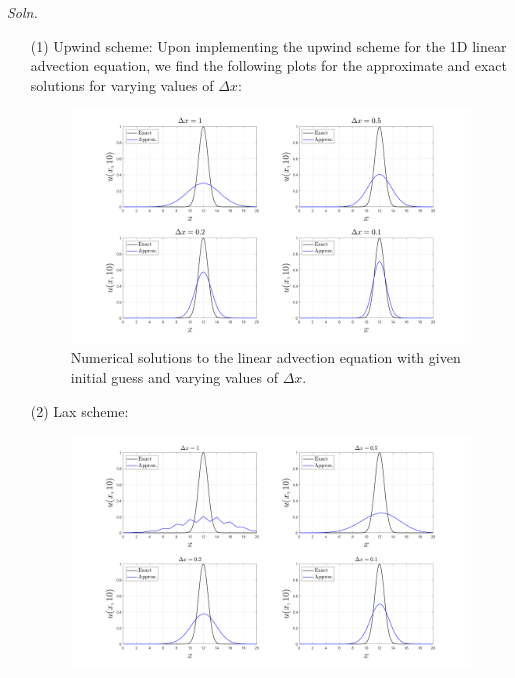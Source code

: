 \documentclass{article}
\begin{document}
\begin{itemize}
    \textit{Soln.}
    \begin{itemize}
        \item[(1)] Upwind scheme:
        \newline\newline
        Upon implementing the upwind scheme for the 1D linear advection equation, we find the following plots for the approximate and exact solutions for varying values of $\Delta x$:
        \begin{figure}[H]
        \begin{center}
            \includegraphics[scale = 0.25]{prob_2_upwind_subplots.png}
            \caption{Numerical solutions to the linear advection equation with given initial guess and varying values of $\Delta x$.}
        \end{center}
        \end{figure}


        \item[(2)] Lax scheme:
        \newline\newline
        \begin{figure}[H]
        \begin{center}
            \includegraphics[scale = 0.25]{prob_2_lax_subplots.png}
        \end{center}
        \end{figure}


\end{itemize}
\end{itemize}
\end{document}
